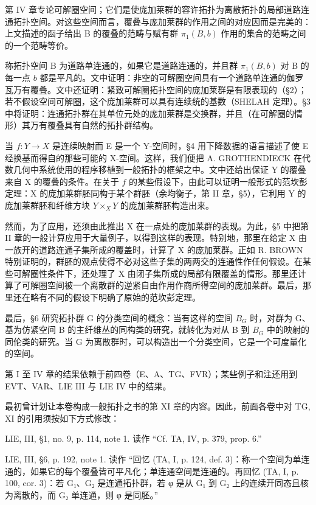 \documentclass[UTF8,12pt,a4paper,oneside]{ctexbook}
\begin{document}
第 IV 章专论可解圈空间；它们是使庞加莱群的容许拓扑为离散拓扑的局部道路连通拓扑空间。对这些空间而言，覆叠与庞加莱群的作用之间的对应因而是完美的：上文描述的函子给出 B 的覆叠的范畴与赋有群 \(\pi_{1}(B,b)\) 作用的集合的范畴之间的一个范畴等价。

称拓扑空间 B 为道路单连通的，如果它是道路连通的，并且群 \(\pi_1(B, b)\) 对 B 的每一点 \(b\) 都是平凡的。文中证明：非空的可解圈空间具有一个道路单连通的伽罗瓦万有覆叠。文中还证明：紧致可解圈拓扑空间的庞加莱群是有限表现的（§2）；若不假设空间可解圈，这个庞加莱群可以具有连续统的基数（SHELAH 定理）。§3 中将证明：连通拓扑群在其单位元处的庞加莱群是交换群，并且（在可解圈的情形）其万有覆叠具有自然的拓扑群结构。

当 \(f \colon Y \to X\) 是连续映射而 E 是一个 Y-空间时，§4 用下降数据的语言描述了使 E 经换基而得自的那些可能的 X-空间。这样，我们便把 A. GROTHENDIECK 在代数几何中系统使用的程序移植到一般拓扑的框架之中。文中还给出保证 Y 的覆叠来自 X 的覆叠的条件。在关于 \(f\) 的某些假设下，由此可以证明一般形式的范坎彭定理：X 的庞加莱群胚同构于某个群胚（余均衡子，第 II 章，§5），它利用 Y 的庞加莱群胚和纤维方块 \(Y \times_X Y\) 的庞加莱群胚构造出来。

然而，为了应用，还须由此推出 X 在一点处的庞加莱群的表现。为此，§5 中把第 II 章的一般计算应用于大量例子，以得到这样的表现。特别地，那里在给定 X 由一族开的道路连通子集所成的覆盖时，计算了 X 的庞加莱群。正如 R. BROWN 特别证明的，群胚的观点使得不必对这些子集的两两交的连通性作任何假设。在某些可解圈性条件下，还处理了 X 由闭子集所成的局部有限覆盖的情形。那里还计算了可解圈空间被一个离散群的逆紧自由作用作商所得空间的庞加莱群。最后，那里还在略有不同的假设下明确了原始的范坎彭定理。

最后，§6 研究拓扑群 G 的分类空间的概念：当有这样的空间 \(B_{G}\) 时，对群为 G、基为仿紧空间 B 的主纤维丛的同构类的研究，就转化为对从 B 到 \(B_{G}\) 中的映射的同伦类的研究。当 G 为离散群时，可以构造出一个分类空间，它是一个可度量化的空间。

第 I 至 IV 章的结果依赖于前四卷（E、A、TG、FVR）；某些例子和注还用到 EVT、VAR、LIE III 与 LIE IV 中的结果。

最初曾计划让本卷构成一般拓扑之书的第 XI 章的内容。因此，前面各卷中对 TG, XI 的引用须按如下方式修改：

LIE, III, §1, no. 9, p. 114, note 1. 读作 “Cf. TA, IV, p. 379, prop. 6.”

LIE, III, §6, p. 192, note 1. 读作 “回忆 (TA, I, p. 124, def. 3)：称一个空间为单连通的，如果它的每个覆叠皆可平凡化；单连通空间是连通的。再回忆 (TA, I, p. 100, cor. 3)：若 G₁、G₂ 是连通拓扑群，若 φ 是从 G₁ 到 G₂ 上的连续开同态且核为离散的，而 G₂ 单连通，则 φ 是同胚。”
\end{document}
